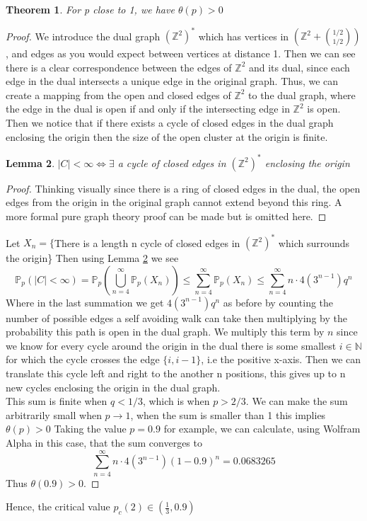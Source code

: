 \documentclass[a4paper,11pt]{article}
\newtheorem{theorem}{Theorem}[section]
\newtheorem{lemma}[theorem]{Lemma}
\theoremstyle{definition}
\newcommand{\ints}{\mathbb{Z}}
\newcommand{\ztwodual}{(\ints^2)^*}
\newcommand{\prob}{\mathbb{P}_p}
\begin{document}
\begin{theorem}
	For p close to 1, we have $\theta(p) > 0$
\end{theorem}
\begin{proof}
	We introduce the dual graph $(\ints^2)^*$ which has vertices in $(\ints^2 + \binom{1/2}{1/2} )$, and edges as you would expect between vertices at distance 1.
	Then we can see there is a clear correspondence between the edges of $\ints^2$ and its dual, since each edge in the dual intersects a unique edge in the original graph. 
	Thus, we can create a mapping from the open and closed edges of $\ints^2$ to the dual graph, where the edge in the dual is open if and only if the intersecting edge in $\ints^2$ is open.\\
	Then we notice that if there exists a cycle of closed edges in the dual graph enclosing the origin then the size of the open cluster at the origin is finite. 
	\begin{lemma}\label{originloop}
		$|C| < \infty \iff \exists$ a cycle of closed edges in $(\ints^2)^*$  enclosing the origin
	\end{lemma}
	\begin{proof}
		{Thinking visually since there is a ring of closed edges in the dual, the open edges from the origin in the original graph cannot extend beyond this ring. A more formal pure graph theory proof can be made but is omitted here.}
	\end{proof}
	Let $X_n = \{$There is a length n cycle of closed edges in $\ztwodual$ which surrounds the origin\}
	Then using Lemma \ref{originloop} we see
	$$\prob(|C| < \infty) = \prob(\bigcup_{n=4}^\infty \prob(X_n)) \leq \sum_{n=4}^\infty \prob(X_n) \leq \sum_{n=4}^\infty n \cdot 4(3^{n-1})q^n$$
	Where in the last summation we get $4(3^{n-1})q^n$ as before by counting the number of possible edges a self avoiding walk can take then multiplying by the probability this path is open in the dual graph. 
	We multiply this term by $n$ since we know for every cycle around the origin in the dual there is some smallest $i \in \mathbb{N}$ for which the cycle crosses the edge $\{i,i-1\}$, i.e the positive x-axis. 
	Then we can translate this cycle left and right to the another n positions, this gives up to n new cycles enclosing the origin in the dual graph.\\
	This sum is finite when $q<1/3$, which is when $p>2/3$. 
	We can make the sum arbitrarily small when $p \rightarrow 1$, when the sum is smaller than 1 this implies $\theta(p) > 0$
	Taking the value $p=0.9$ for example, we can calculate, using Wolfram Alpha in this case, that the sum converges to 
	$$\sum_{n=4}^\infty n \cdot 4(3^{n-1})(1-0.9)^n = 0.0683265$$
	Thus $\theta(0.9) > 0$.

\end{proof}
Hence, the critical value $p_c(2) \in (\frac{1}{3},0.9)$
\end{document}
